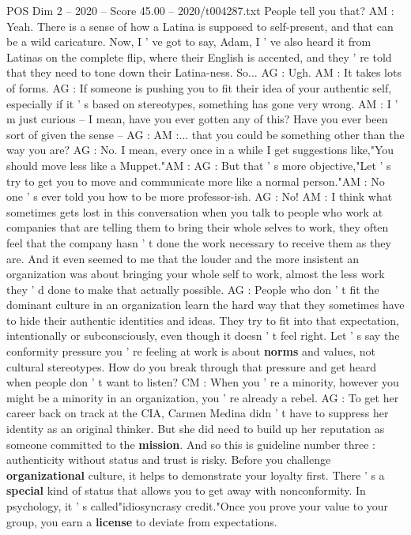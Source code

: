 \begin{textsample}{POS Dim 2 – 2020 – Score 45.00 – 2020/t004287.txt}
People tell you that?
AM : Yeah.
There is a sense of how a Latina is supposed to self-present, and that can be a wild caricature.
Now, I ' ve got to say, Adam, I ' ve also heard it from Latinas on the complete flip, where their English is accented, and they ' re told that they need to tone down their Latina-ness.
So...
AG : Ugh.
AM : It takes lots of forms.
AG : If someone is pushing you to fit their idea of your authentic self, especially if it ' s based on stereotypes, something has gone very wrong.
AM : I ' m just curious -- I mean, have you ever gotten any of this?
Have you ever been sort of given the sense -- AG : AM :... that you could be something other than the way you are?
AG : No.
I mean, every once in a while I get suggestions like,"You should move less like a Muppet."AM : AG : But that ' s more objective,"Let ' s try to get you to move and communicate more like a normal person."AM : No one ' s ever told you how to be more professor-ish.
AG : No!
AM : I think what sometimes gets lost in this conversation when you talk to people who work at companies that are telling them to bring their whole selves to work, they often feel that the company hasn ' t done the work necessary to receive them as they are.
And it even seemed to me that the louder and the more insistent an organization was about bringing your whole self to work, almost the less work they ' d done to make that actually possible.
AG : People who don ' t fit the dominant culture in an organization learn the hard way that they sometimes have to hide their authentic identities and ideas.
They try to fit into that expectation, intentionally or subconsciously, even though it doesn ' t feel right.
Let ' s say the conformity pressure you ' re feeling at work is about \textbf{norms} and values, not cultural stereotypes.
How do you break through that pressure and get heard when people don ' t want to listen?
CM : When you ' re a minority, however you might be a minority in an organization, you ' re already a rebel.
AG : To get her career back on track at the CIA, Carmen Medina didn ' t have to suppress her identity as an original thinker.
But she did need to build up her reputation as someone committed to the \textbf{mission}.
And so this is guideline number three : authenticity without status and trust is risky.
Before you challenge \textbf{organizational} culture, it helps to demonstrate your loyalty first.
There ' s a \textbf{special} kind of status that allows you to get away with nonconformity.
In psychology, it ' s called"idiosyncrasy credit."Once you prove your value to your group, you earn a \textbf{license} to deviate from expectations.

\end{textsample}
